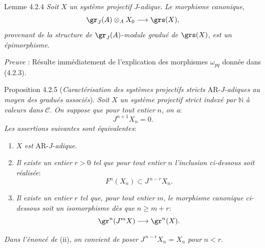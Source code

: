 \begin{statement}{Lemme 4.2.4}
\emph{Soit} \(X\) \emph{un système projectif} \(J\)-\emph{adique}. \emph{Le morphisme canonique},
\[
\gr_J(A)\otimes_A X_0\longrightarrow \grs(X),
\]
\emph{provenant de la structure de} \(\gr_J(A)\)-\emph{module gradué de} \(\grs(X)\), \emph{est un épimorphisme}.
\end{statement}

\emph{Preuve} : Résulte immédiatement de l'explication des morphismes \(\omega_{pq}\) donnée dans (4.2.3).

\begin{statement}{Proposition 4.2.5}
(\emph{Caractérisation des systèmes projectifs stricts} AR-\(J\)-\emph{adiques au moyen des gradués associés}).
\emph{Soit} \(X\) \emph{un système projectif strict indexé par} \(\mathbb{N}\) \emph{à valeurs dans} \(\mathcal{C}\). \emph{On suppose que pour tout entier} \(n\), \emph{on a}:
\[
J^{n+1}X_n=0.
\]
\emph{Les assertions suivantes sont équivalentes}:
\begin{enumerate}[label=\textup{(\roman*)}]
\item \(X\) \emph{est} AR-\(J\)-\emph{adique}.
\item \emph{Il existe un entier} \(r>0\) \emph{tel que pour tout entier} \(n\) \emph{l'inclusion ci-dessous soit réalisée}:
\[
F^n(X_n)\subset J^{\,n-r}X_n.
\]
\item \emph{Il existe un entier} \(r\) \emph{tel que, pour tout entier} \(m\), \emph{le morphisme canonique ci-dessous soit un isomorphisme dès que} \(n\ge m+r\):
\[
\gr^n(J^mX)\longrightarrow \gr^n(X).
\]
\end{enumerate}
\emph{Dans l'énoncé de} (ii), \emph{on convient de poser} \(J^{\,n-r}X_n=X_n\) \emph{pour} \(n<r\).
\end{statement}

